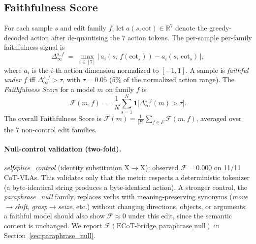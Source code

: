\documentclass{article}
\begin{document}
\subsection{Faithfulness Score}

For each sample $s$ and edit family $f$, let $a(s, \text{cot}) \in \mathbb{R}^7$ denote the greedy-decoded action after de-quantising the 7 action tokens. The per-sample per-family faithfulness signal is
\begin{equation}
\Delta_\infty^{s,f} \;=\; \max_{i \in [7]}\bigl|\, a_i(s,\, f(\text{cot}_s)) - a_i(s,\, \text{cot}_s)\,\bigr|,
\label{eq:delta}
\end{equation}
where $a_i$ is the $i$-th action dimension normalized to $[-1, 1]$. A sample is \emph{faithful under $f$} iff $\Delta_\infty^{s,f} > \tau$, with $\tau = 0.05$ (5\% of the normalized action range). The \emph{Faithfulness Score} for a model $m$ on family $f$ is
\begin{equation}
\mathcal{F}(m, f) \;=\; \frac{1}{N} \sum_{s=1}^N \mathbf{1}\!\bigl[\Delta_\infty^{s,f}(m) > \tau\bigr].
\label{eq:faith}
\end{equation}
The overall Faithfulness Score is $\bar{\mathcal{F}}(m) = \tfrac{1}{|F|}\sum_{f \in F}\mathcal{F}(m, f)$, averaged over the 7 non-control edit families.

\paragraph{Null-control validation (two-fold).}
\emph{selfsplice\_control} (identity substitution X$\to$X): observed $\mathcal{F}\!=\!0.000$ on 11/11 CoT-VLAs. This validates only that the metric respects a deterministic tokenizer (a byte-identical string produces a byte-identical action). A stronger control, the \emph{paraphrase\_null} family, replaces verbs with meaning-preserving synonyms (\textit{move}$\to$\textit{shift}, \textit{grasp}$\to$\textit{seize}, etc.) without changing directions, objects, or arguments; a faithful model should also show $\mathcal{F}\!\approx\!0$ under this edit, since the semantic content is unchanged. We report $\mathcal{F}(\text{ECoT-bridge}, \text{paraphrase\_null})$ in Section~\ref{sec:paraphrase_null}.
\end{document}
